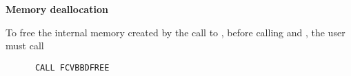 \begin{Steps}
\item {\bf Memory deallocation}

  To free the internal memory created by the call to , before calling
   and , the user must call
\begin{verbatim}
      CALL FCVBBDFREE
\end{verbatim}

\end{Steps}
